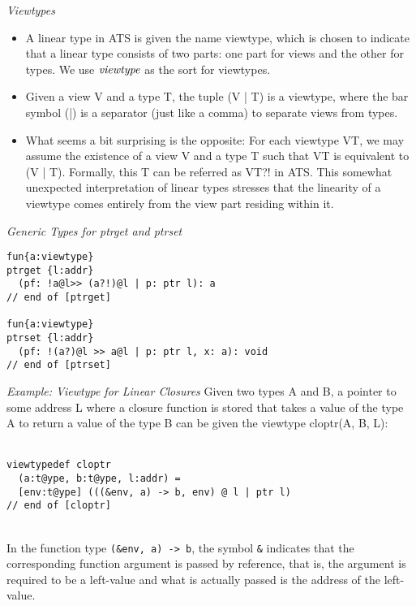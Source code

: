 \documentclass[pdf]{prosper}
\begin{document}
\def\VT{{\it VT}}
\def\sviewtype{{\it viewtype}}
\begin{slide}{\em Viewtypes}
\begin{itemize}
\item
A linear type in ATS is given the name viewtype, which is chosen to
indicate that a linear type consists of two parts: one part for views and
the other for types. We use $\sviewtype$ as the sort for viewtypes.
\item Given a view V and a type T, the
tuple (V | T) is a viewtype, where the bar symbol (|) is a separator (just
like a comma) to separate views from types.
\item
What seems a bit surprising is the opposite: For each viewtype VT, we may
assume the existence of a view V and a type T such that VT is equivalent to
(V | T). Formally, this T can be referred as VT?! in ATS. This somewhat
unexpected interpretation of linear types stresses that the linearity of a
viewtype comes entirely from the view part residing within it.
\end{itemize}
\vfill
\end{slide}
\begin{slide}{\em Generic Types for {\it ptrget} and {\it ptrset}}
{\blue\begin{verbatim}
fun{a:viewtype}
ptrget {l:addr}
  (pf: !a@l>> (a?!)@l | p: ptr l): a
// end of [ptrget]

fun{a:viewtype}
ptrset {l:addr}
  (pf: !(a?)@l >> a@l | p: ptr l, x: a): void
// end of [ptrset]
\end{verbatim}
}
\end{slide}
\begin{slide}{\em Example: Viewtype for Linear Closures}
Given two types A and B, a pointer to some address L where a closure
function is stored that takes a value of the type A to return a value of
the type B can be given the viewtype cloptr(A, B, L):\\~\\
{\blue\begin{verbatim}
viewtypedef cloptr
  (a:t@ype, b:t@ype, l:addr) =
  [env:t@ype] (((&env, a) -> b, env) @ l | ptr l)
// end of [cloptr]
\end{verbatim}
}~\\
In the function type \verb`(&env, a) -> b`, the symbol \verb`&` indicates
that the corresponding function argument is passed by reference, that is,
the argument is required to be a left-value and what is actually passed is
the address of the left-value.
\end{slide}
\end{document}
